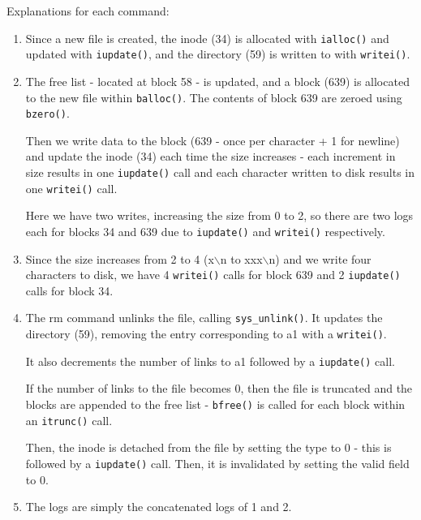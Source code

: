\documentclass[9pt]{amsart}
\begin{document}
    Explanations for each command: 

    \begin{enumerate}
        \item Since a new file is created, the inode (34) is allocated with \texttt{ialloc()} and updated with \texttt{iupdate()}, and the directory (59) is written to with \texttt{writei()}.
        \item The free list - located at block 58 - is updated, and a block (639) is allocated to the new file within \texttt{balloc()}. The contents of block 639 are zeroed using \texttt{bzero()}. 
            
        Then we write data to the block (639 - once per character + 1 for newline) and update the inode (34) each time the size increases - each increment in size results in one \texttt{iupdate()} call and each character written to disk results in one \texttt{writei()} call. 
            
        Here we have two writes, increasing the size from 0 to 2, so there are two logs each for blocks 34 and 639 due to \texttt{iupdate()} and \texttt{writei()} respectively. 
        \item Since the size increases from 2 to 4 (x\(\backslash\)n to xxx\(\backslash\)n) and we write four characters to disk, we have 4 \texttt{writei()} calls for block 639 and 2 \texttt{iupdate()} calls for block 34. 
        \item The rm command unlinks the file, calling \texttt{sys\_unlink()}. It updates the directory (59), removing the entry corresponding to a1 with a \texttt{writei()}. 
        
        It also decrements the number of links to a1 followed by a \texttt{iupdate()} call. 
        
        If the number of links to the file becomes 0, then the file is truncated and the blocks are appended to the free list - \texttt{bfree()} is called for each block within an \texttt{itrunc()} call. 

        Then, the inode is detached from the file by setting the type to 0 - this is followed by a \texttt{iupdate()} call. Then, it is invalidated by setting the valid field to 0.
        
        \item The logs are simply the concatenated logs of 1 and 2.
    \end{enumerate}
\end{document}
